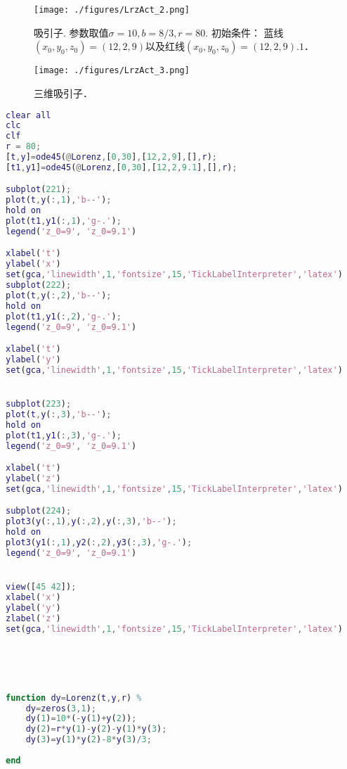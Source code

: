\begin{figure}[ht]
\centering
\texttt{[image: ./figures/LrzAct\_2.png]}
\caption{吸引子. 参数取值$\sigma=10,b=8/3, r=80$. 初始条件： 蓝线$(x_0,y_0,z_0)=(12,2,9)$以及红线$(x_0,y_0,z_0)=(12,2,9).1$．} \label{LrzAct_fig2}
\end{figure}

\begin{figure}[ht]
\centering
\texttt{[image: ./figures/LrzAct\_3.png]}
\caption{三维吸引子．} \label{LrzAct_fig3}
\end{figure}

\begin{lstlisting}[language=matlab]
clear all
clc
clf
r = 80;
[t,y]=ode45(@Lorenz,[0,30],[12,2,9],[],r);
[t1,y1]=ode45(@Lorenz,[0,30],[12,2,9.1],[],r);

subplot(221);
plot(t,y(:,1),'b--');
hold on
plot(t1,y1(:,1),'g-.');
legend('z_0=9', 'z_0=9.1')

xlabel('t')
ylabel('x')
set(gca,'linewidth',1,'fontsize',15,'TickLabelInterpreter','latex')
subplot(222);
plot(t,y(:,2),'b--');
hold on
plot(t1,y1(:,2),'g-.');
legend('z_0=9', 'z_0=9.1')

xlabel('t')
ylabel('y')
set(gca,'linewidth',1,'fontsize',15,'TickLabelInterpreter','latex')


subplot(223);
plot(t,y(:,3),'b--');
hold on
plot(t1,y1(:,3),'g-.');
legend('z_0=9', 'z_0=9.1')

xlabel('t')
ylabel('z')
set(gca,'linewidth',1,'fontsize',15,'TickLabelInterpreter','latex')

subplot(224);
plot3(y(:,1),y(:,2),y(:,3),'b--');
hold on
plot3(y1(:,1),y2(:,2),y3(:,3),'g-.');
legend('z_0=9', 'z_0=9.1')


view([45 42]);
xlabel('x')
ylabel('y')
zlabel('z')
set(gca,'linewidth',1,'fontsize',15,'TickLabelInterpreter','latex')





function dy=Lorenz(t,y,r) %
    dy=zeros(3,1);
    dy(1)=10*(-y(1)+y(2));
    dy(2)=r*y(1)-y(2)-y(1)*y(3);
    dy(3)=y(1)*y(2)-8*y(3)/3;
    
end

\end{lstlisting}